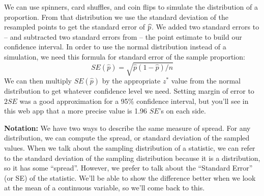  

      
  
We can use spinners, card shuffles,  and coin flips to simulate the distribution
of a proportion.  From that distribution we use the standard
deviation of the resampled points to get the standard error of
$\widehat{p}$.  We added two standard errors 
to -- and subtracted two standard errors from -- the point estimate to build our
confidence interval.  In order to use the normal distribution instead of a
simulation,  we need this formula for standard error of the sample
proportion: 
    $$ SE(\widehat{p}) = \sqrt{\widehat{p}(1-\widehat{p})/n} $$
 We can then multiply $SE(\widehat{p})$ by the appropriate $z^*$
 value from the normal distribution to get whatever confidence
 level we need.  Setting margin of error to $2 SE$ was a good
 approximation for a 95\% confidence interval, but you'll see in
 this web app that a more precise value is 1.96 $SE$'s on each
 side.


{\bf Notation:} We have two ways to describe the same measure
of spread. For any distribution, we can compute the spread, or
standard deviation of the sampled values.  When we talk about the
sampling distribution of a statistic, we can  refer to the
standard deviation of the sampling distribution because it is a
distribution, so it has some ``spread''.   However, we prefer
to talk about the ``Standard Error'' (or SE) of the statistic.  We'll
be able to show the difference better when we look at the mean of a
continuous variable, so we'll come back to this. 

